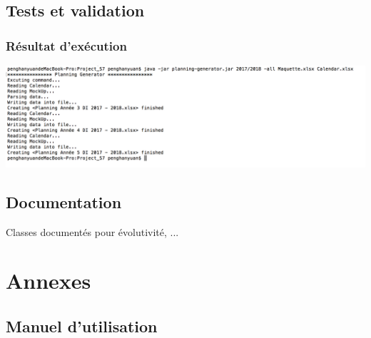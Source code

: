 \documentclass{polytech/polytech}
\begin{document}
	\section{Tests et validation}
	\subsection{Résultat d'exécution}
	\includegraphics[width=\textwidth]{./img/excution_result.png}
	\section{Documentation}

	Classes documentés pour évolutivité, ...

	\chapter{Annexes}

	\section{Manuel d'utilisation}
	
\end{document}
